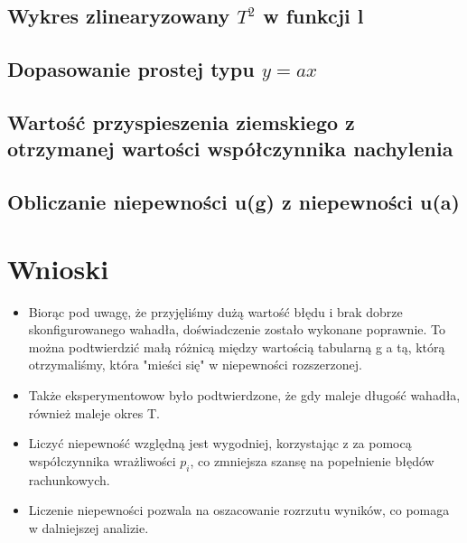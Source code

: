 \documentclass[18pt, twoside]{article}
\begin{document}
	\subsection{Wykres zlinearyzowany \(T^2\) w funkcji l}
	
	\subsection{Dopasowanie prostej typu \(y = ax\)}
	\subsection{Wartość przyspieszenia 
	ziemskiego z otrzymanej wartości współczynnika nachylenia}
	
	\subsection{Obliczanie niepewności u(g) z niepewności u(a) }
	\section{Wnioski}
	\begin{itemize}
	
    \item Biorąc pod uwagę, że przyjęliśmy dużą wartość błędu i brak dobrze skonfigurowanego wahadła, doświadczenie zostało wykonane poprawnie. To można podtwierdzić małą różnicą między wartością tabularną g a tą, którą otrzymaliśmy, która "mieści się" w niepewności rozszerzonej.
    \item Także eksperymentowow było podtwierdzone, że gdy maleje długość wahadła, również maleje okres T. 
    \item Liczyć niepewność względną jest wygodniej, korzystając z za pomocą współczynnika wrażliwości \(p_i\), co zmniejsza szansę na popełnienie błędów rachunkowych.
    \item Liczenie niepewności pozwala na oszacowanie rozrzutu wyników, co pomaga w dalniejszej analizie.
    \end{itemize}
\end{document}
